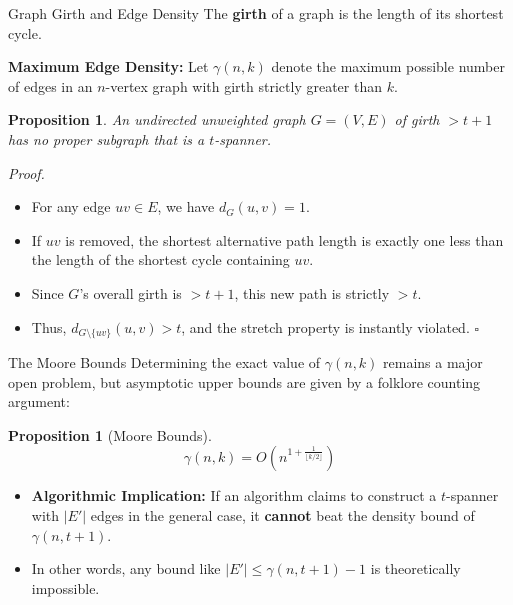 \documentclass{beamer}
\newtheorem{proposition}[theorem]{Proposition}
\begin{document}
\begin{frame}{Graph Girth and Edge Density}
    The \textbf{girth} of a graph is the length of its shortest cycle. 
    
    \vspace{0.2cm}
    \textbf{Maximum Edge Density:} Let $\gamma(n,k)$ denote the maximum possible number of edges in an $n$-vertex graph with girth strictly greater than $k$.
    
    \vspace{0.3cm}
    \begin{proposition}
        An undirected unweighted graph $G = (V,E)$ of girth $> t + 1$ has no proper subgraph that is a $t$-spanner.
    \end{proposition}
    
    \vspace{0.1cm}
    \textit{Proof.}
    \begin{itemize}
        \item For any edge $uv \in E$, we have $d_G(u,v) = 1$.
        \item If $uv$ is removed, the shortest alternative path length is exactly one less than the length of the shortest cycle containing $uv$.
        \item Since $G$'s overall girth is $> t + 1$, this new path is strictly $> t$.
        \item Thus, $d_{G \setminus \{uv\}}(u,v) > t$, and the stretch property is instantly violated. \hfill $\square$
    \end{itemize}
\end{frame}

\begin{frame}{The Moore Bounds}
    Determining the exact value of $\gamma(n,k)$ remains a major open problem, but asymptotic upper bounds are given by a folklore counting argument:
    
    \vspace{0.4cm}
    \begin{proposition}[Moore Bounds]
        \[ \gamma(n,k) = O\left(n^{1 + \frac{1}{\lfloor k/2 \rfloor}}\right) \]
    \end{proposition}
    
    \vspace{0.6cm}
    \begin{itemize}
        \item \textbf{Algorithmic Implication:} If an algorithm claims to construct a $t$-spanner with $|E'|$ edges in the general case, it \textbf{cannot} beat the density bound of $\gamma(n, t+1)$. 
        \item In other words, any bound like $|E'| \le \gamma(n, t+1) - 1$ is theoretically impossible.
    \end{itemize}
\end{frame}
\end{document}
